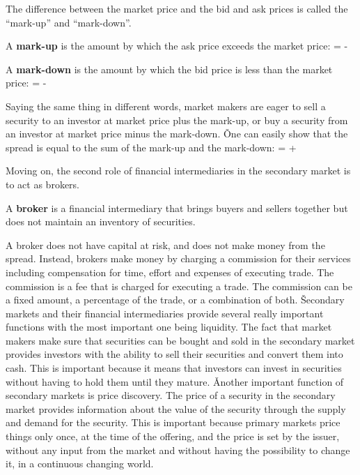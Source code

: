 The difference between the market price and the bid and ask prices is called the ``mark-up'' and ``mark-down''.

\bd[Mark-Up]
A \textbf{mark-up} is the amount by which the ask price exceeds the market price:
\bse
{} =  - 
\ese
\ed

A \textbf{mark-down} is the amount by which the bid price is less than the market price:
\bse
{} =  - 
\ese
\ed

Saying the same thing in different words, market makers are eager to sell a security to an investor at market price
plus the mark-up, or buy a security from an investor at market price minus the mark-down. \v

One can easily show that the spread is equal to the sum of the mark-up and the mark-down:
\bse
{} =  + 
\ese

Moving on, the second role of financial intermediaries in the secondary market is to act as brokers.

\bd[Broker]
A \textbf{broker} is a financial intermediary that brings buyers and sellers together but does not maintain an
inventory of securities.
\ed

A broker does not have capital at risk, and does not make money from the spread. Instead, brokers make money by
charging a commission for their services including compensation for time, effort and expenses of executing trade. The
commission is a fee that is charged for executing a trade. The commission can be a fixed amount, a percentage of the
trade, or a combination of both. \v

Secondary markets and their financial intermediaries provide several really important functions with the most important
one being liquidity. The fact that market makers make sure that securities can be bought and sold in the secondary
market provides investors with the ability to sell their securities and convert them into cash. This is important
because it means that investors can invest in securities without having to hold them until they mature. \v

Another important function of secondary markets is price discovery. The price of a security in the secondary market
provides information about the value of the security through the supply and demand for the security. This is important
because primary markets price things only once, at the time of the offering, and the price is set by the issuer,
without any input from the market and without having the possibility to change it, in a continuous changing world.








